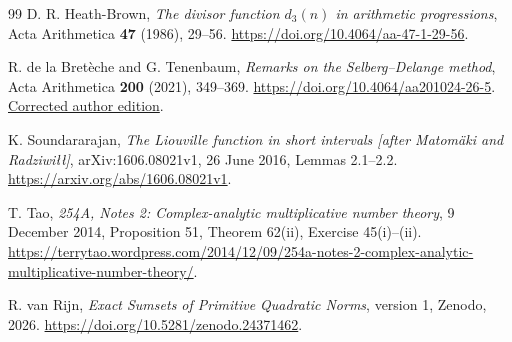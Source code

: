 \begin{thebibliography}{99}
D. R. Heath-Brown,
\emph{The divisor function \(d_3(n)\) in arithmetic progressions},
Acta Arithmetica \textbf{47} (1986), 29--56.
\url{https://doi.org/10.4064/aa-47-1-29-56}.

R. de la Bret\`eche and G. Tenenbaum,
\emph{Remarks on the Selberg--Delange method},
Acta Arithmetica \textbf{200} (2021), 349--369.
\url{https://doi.org/10.4064/aa201024-26-5}.
\href{https://tenenb.perso.math.cnrs.fr/PPP/On-SD.pdf}{Corrected author edition}.

K. Soundararajan,
\emph{The Liouville function in short intervals
[after Matom\"aki and Radziwi\l\l]},
arXiv:1606.08021v1, 26 June 2016, Lemmas 2.1--2.2.
\url{https://arxiv.org/abs/1606.08021v1}.

T. Tao,
\emph{254A, Notes 2: Complex-analytic multiplicative number theory},
9 December 2014, Proposition 51, Theorem 62(ii),
Exercise 45(i)--(ii).
\url{https://terrytao.wordpress.com/2014/12/09/254a-notes-2-complex-analytic-multiplicative-number-theory/}.

R. van Rijn,
\emph{Exact Sumsets of Primitive Quadratic Norms},
version 1, Zenodo, 2026.
\url{https://doi.org/10.5281/zenodo.24371462}.

\end{thebibliography}
